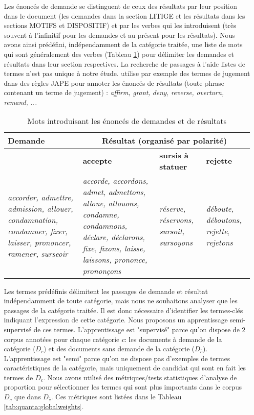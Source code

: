 Les énoncés de demande se distinguent de ceux des résultats par leur position dans le document (les demandes dans la section LITIGE et les résultats dans les sections MOTIFS et DISPOSITIF) et par les verbes qui les introduisent (très souvent à l'infinitif pour les demandes et au présent pour les résultats). Nous avons ainsi prédéfini, indépendamment de la catégorie traitée, une liste de mots qui sont généralement des verbes (Tableau \ref{tab:quanta:mots-introductifs}) pour délimiter les demandes et résultats dans leur section respectives. La recherche de passages à l'aide listes de termes n'est pas unique à notre étude. \cite{wyner2010extractlegalelts} utilise par exemple des termes de jugement dans des règles JAPE pour annoter les énoncés de résultats (toute phrase contenant un terme de jugement) : \textit{affirm, grant, deny, reverse, overturn, remand, ...}
\begin{table}
\centering
\scriptsize
 \begin{tabular}{|p{}|p{}|p{}|p{}|}
 \hline
 \textbf{Demande} & \multicolumn{3}{c|}{\textbf{Résultat} (organisé par polarité)} \\ \hline
  & \textbf{accepte}  &\textbf{sursis à statuer} & \textbf{rejette}  \\ \hline
 \textit{accorder, admettre, admission, allouer, condamnation, condamner, fixer, laisser, prononcer, ramener, surseoir} & \textit{accorde, accordons, admet, admettons, alloue, allouons, condamne, condamnons, déclare, déclarons, fixe, fixons, laisse, laissons, prononce, prononçons} & \textit{réserve, réservons, sursoit, sursoyons} & \textit{déboute, déboutons, rejette, rejetons} \\ \hline
 \end{tabular}
  \caption{Mots introduisant les énoncés de demandes et de résultats}\label{tab:quanta:mots-introductifs}
 \end{table}

Les termes prédéfinis délimitent les passages de demande et résultat indépendamment de toute catégorie, mais nous ne souhaitons analyser que les passages de la catégorie traitée. Il est donc nécessaire d'identifier les termes-clés indiquant l'expression de cette catégorie. Nous proposons un apprentissage semi-supervisé de ces termes. L'apprentissage est "supervisé" parce qu'on dispose de 2 corpus annotées pour chaque catégorie $c$: les documents à demande de la catégorie ($D_c$) et des documents sans demande de la catégorie ($D_{\overline{c}}$). L'apprentissage est "semi" parce qu'on ne dispose pas d'exemples de termes caractéristiques de la catégorie, mais uniquement de candidat qui sont en fait les termes de $D_c$. Nous avons utilisé des métriques/tests statistiques d'analyse de proportion pour sélectionner les termes qui sont plus importants dans le corpus $D_c$ que dans $D_{\overline{c}}$. Ces métriques sont listées dans le Tableau \ref{tab:quanta:globalweights}.

